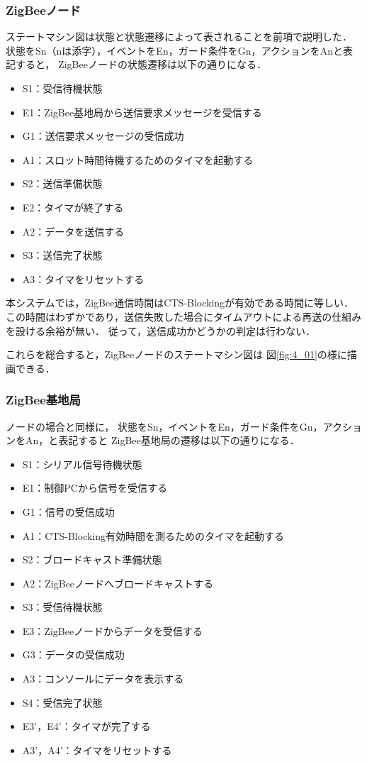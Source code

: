\documentclass[12pt]{jreport}
\begin{document}
\subsubsection{ZigBeeノード}

ステートマシン図は状態と状態遷移によって表されることを前項で説明した．
状態をSn（nは添字），イベントをEn，ガード条件をGn，アクションをAnと表記すると，
ZigBeeノードの状態遷移は以下の通りになる．

\begin{itemize}
 \item S1：受信待機状態
 \item E1：ZigBee基地局から送信要求メッセージを受信する
 \item G1：送信要求メッセージの受信成功
 \item A1：スロット時間待機するためのタイマを起動する
 \item S2：送信準備状態
 \item E2：タイマが終了する
 \item A2：データを送信する
 \item S3：送信完了状態
 \item A3：タイマをリセットする
\end{itemize}

本システムでは，ZigBee通信時間はCTS-Blockingが有効である時間に等しい．
この時間はわずかであり，送信失敗した場合にタイムアウトによる再送の仕組みを設ける余裕が無い．
従って，送信成功かどうかの判定は行わない．

これらを総合すると，ZigBeeノードのステートマシン図は
図\ref{fig:4_01}の様に描画できる．

\subsubsection{ZigBee基地局}

ノードの場合と同様に，
状態をSn，イベントをEn，ガード条件をGn，アクションをAn，と表記すると
ZigBee基地局の遷移は以下の通りになる．

\begin{itemize}
 \item S1：シリアル信号待機状態
 \item E1：制御PCから信号を受信する
 \item G1：信号の受信成功
 \item A1：CTS-Blocking有効時間を測るためのタイマを起動する
 \item S2：ブロードキャスト準備状態
 \item A2：ZigBeeノードへブロードキャストする
 \item S3：受信待機状態
 \item E3：ZigBeeノードからデータを受信する
 \item G3：データの受信成功
 \item A3：コンソールにデータを表示する
 \item S4：受信完了状態
 \item E3'，E4'：タイマが完了する
 \item A3'，A4'：タイマをリセットする
\end{itemize}
\end{document}

